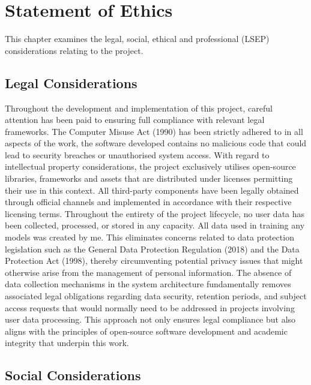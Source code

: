 \chapter{Statement of Ethics}

This chapter examines the legal, social, ethical and professional (LSEP) considerations relating to the project.

\section{Legal Considerations}

Throughout the development and implementation of this project, careful attention has been paid to ensuring full compliance with relevant legal frameworks. 
The Computer Misuse Act (1990) has been strictly adhered to in all aspects of the work, the software developed contains no malicious code that could lead to security breaches or unauthorised system access. 
With regard to intellectual property considerations, the project exclusively utilises open-source libraries, frameworks and assets that are distributed under licenses permitting their use in this context. 
All third-party components have been legally obtained through official channels and implemented in accordance with their respective licensing terms. 
Throughout the entirety of the project lifecycle, no user data has been collected, processed, or stored in any capacity. All data used in training any models was created by me.
This eliminates concerns related to data protection legislation such as the General Data Protection Regulation (2018) and the Data Protection Act (1998), 
thereby circumventing potential privacy issues that might otherwise arise from the management of personal information. 
The absence of data collection mechanisms in the system architecture fundamentally removes associated legal obligations regarding data security, retention periods, 
and subject access requests that would normally need to be addressed in projects involving user data processing.
This approach not only ensures legal compliance but also aligns with the principles of open-source software development and academic integrity that underpin this work.

\section{Social Considerations}

